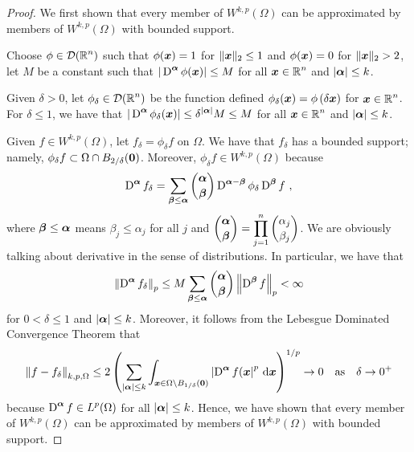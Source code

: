 \begin{proof}
 We first shown that every member of
$\displaystyle W^{k,p}(\Omega)$ can be approximated by members of
$\displaystyle W^{k,p}(\Omega)$ with bounded support.

Choose $\displaystyle \phi\in \mathcal{D}(\mathbb{R}^n)$ such that
$\phi({\bm{x}}) = 1$ for $\|{\bm{x}}\|_2 \leq 1$ and
$\phi({\bm{x}}) = 0$ for $\|{\bm{x}}\|_2 > 2$, let $M$ be a constant such
that $\displaystyle |\operatorname{D}^{{\bm{\alpha}}}\phi({\bm{x}})| \leq M$ for all
$\displaystyle {\bm{x}} \in \mathbb{R}^n$ and
$|{\bm{\alpha}}| \leq k$.

Given $\delta >0$, let $\displaystyle \phi_\delta \in \mathcal{D}(\mathbb{R}^n)$ be
the function defined
$\displaystyle \phi_\delta({\bm{x}}) = \phi\left(\delta {\bm{x}}\right)$
for $\displaystyle {\bm{x}} \in \mathbb{R}^n$.  For $\delta \leq 1$, we have that
$\displaystyle |\operatorname{D}^{{\bm{\alpha}}} \phi_\delta({\bm{x}})| \leq
\delta^{|{\bm{\alpha}}|} M \leq M$ for all
$\displaystyle {\bm{x}} \in \mathbb{R}^n$ and $|{\bm{\alpha}}| \leq k$.

Given $\displaystyle f \in W^{k,p}(\Omega)$, let
$f_\delta = \phi_\delta f$ on $\Omega$.  We have that $f_\delta$ has a bounded
support; namely,
$\displaystyle \phi_\delta f \subset \Omega \cap B_{2/\delta}({\bm{0}})$.
Moreover, $\displaystyle \phi_\delta f \in W^{k,p}(\Omega)$ because
\[
\diff^{\VEC{\alpha}} f_\delta = \sum_{\VEC{\beta}\leq \VEC{\alpha}}
\binom{\VEC{\alpha}}{\VEC{\beta}}
\diff^{\VEC{\alpha}-\VEC{\beta}} \phi_{\delta} \diff^{\VEC{\beta}} f \ ,
\]
where ${\bm{\beta}} \leq {\bm{\alpha}}$ means $\beta_j \leq \alpha_j$ for all $j$
and $\displaystyle \binom{{\bm{\alpha}}}{{\bm{\beta}}} = 
\prod_{j=1}^n \binom{\alpha_j}{\beta_j}$.  We are obviously talking
about derivative in the sense of distributions.
In particular, we have that
\[
\left\| \operatorname{D}^{{\bm{\alpha}}} f_\delta \right\|_p
\leq M \sum_{{\bm{\beta}}\leq {\bm{\alpha}}} \binom{{\bm{\alpha}}}{{\bm{\beta}}}
\left\| \operatorname{D}^{{\bm{\beta}}} f \right\|_p < \infty
\]
for $0 < \delta \leq 1$ and $|{\bm{\alpha}}| \leq k$.  Moreover, it follows
from the Lebesgue Dominated Convergence Theorem that
\[
\left\| f - f_\delta \right\|_{k,p,\Omega}
\leq 2 \left(
\sum_{|{\bm{\alpha}}|\leq k} \int_{{\bm{x}} \in \Omega \setminus B_{1/\delta}({\bm{0}})}
\left| \operatorname{D}^{{\bm{\alpha}}} f({\bm{x}} \right|^p \,\mathrm{d}{{\bm{x}}} \right)^{1/p} \to 0 
\quad \text{as} \quad \delta \to 0^+
\]
because $\displaystyle \operatorname{D}^{{\bm{\alpha}}}f \in L^p(\Omega)$ for all
$|{\bm{\alpha}}| \leq k$.  Hence, we have shown that every member of
$\displaystyle W^{k,p}(\Omega)$ can be approximated by members of
$\displaystyle W^{k,p}(\Omega)$ with bounded support.


\end{proof}

